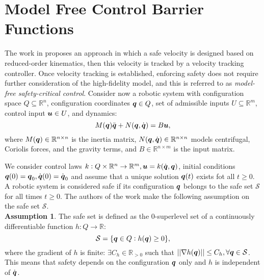 \section{Model Free Control Barrier Functions}
The work in \cite{mf_cbf} proposes an approach in which a safe velocity is designed based on reduced-order kinematics, then this velocity is tracked by a velocity tracking controller. Once velocity tracking is established, enforcing safety does not require further consideration of the high-fidelity model, and this is referred to as \textit{model-free safety-critical control}.
Consider now a robotic system with configuration space $Q \subseteq \mathbb{R}^n$, configuration coordinates ${\boldsymbol{q}} \in Q$, set of admissible inputs $U\subseteq \mathbb{R}^m$, control input $\boldsymbol{u} \in U$, and dynamics:
\begin{equation} \label{eq:dynamic model}
    M({\boldsymbol{q}})\ddot{{\boldsymbol{q}}}+N({\boldsymbol{q}},\dot{{\boldsymbol{q}}})=B\boldsymbol{u},
\end{equation}
where $M({\boldsymbol{q}})\in\mathbb{R}^{n \times n}$ is the inertia matrix, $N({\boldsymbol{q}},\dot{{\boldsymbol{q}}})\in\mathbb{R}^{n \times n}$ models centrifugal, Coriolis forces, and the gravity terms, and $B\in\mathbb{R}^{n \times m}$ is the input matrix.

We consider control laws $ k:Q\times \mathbb{R}^n \rightarrow \mathbb{R}^m, \boldsymbol{u}=k(\dot{{\boldsymbol{q}}},{\boldsymbol{q}})$, initial conditions ${\boldsymbol{q}}(0) = {\boldsymbol{q}}_0, \dot{{\boldsymbol{q}}}(0)=\dot{{\boldsymbol{q}}}_0$ and assume that a unique solution ${\boldsymbol{q}}(t)$ exists fot all $t \geq 0$. A robotic system is considered safe if its configuration ${\boldsymbol{q}}$ belongs to the safe set $\mathcal{S}$ for all times $t\geq 0$. The authors of the work \cite{mf_cbf} make the following assumption on the safe set $\mathcal{S}$.\\
\textbf{Assumption 1}. The safe set is defined as the 0-superlevel set of a continuously differentiable function $h: Q \rightarrow \mathbb{R}$:
\begin{equation} \label{eq:safe set}
    \mathcal{S} = \{{\boldsymbol{q}} \in Q: h({\boldsymbol{q}})\geq 0 \},
\end{equation}
where the gradient of $h$ is finite: $\exists C_h \in \mathbb{R}_{>0}$ such that $|| \nabla h({\boldsymbol{q}})|| \leq C_h, \forall {\boldsymbol{q}} \in \mathcal{S}$. This means that safety depends on the configuration ${\boldsymbol{q}}$ only and $h$ is independent of $\dot{{\boldsymbol{q}}}$.


